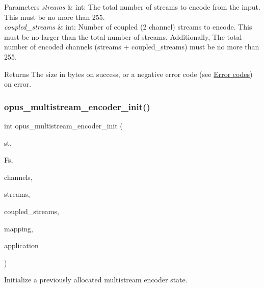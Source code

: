\begin{DoxyParams}{Parameters}
{\em streams} & {\ttfamily int}\+: The total number of streams to encode from the input. This must be no more than 255. \\
\hline
{\em coupled\+\_\+streams} & {\ttfamily int}\+: Number of coupled (2 channel) streams to encode. This must be no larger than the total number of streams. Additionally, The total number of encoded channels ({\ttfamily streams + coupled\+\_\+streams}) must be no more than 255. \\
\hline
\end{DoxyParams}
\begin{DoxyReturn}{Returns}
The size in bytes on success, or a negative error code (see \hyperlink{group__opus__errorcodes}{Error codes}) on error. 
\end{DoxyReturn}
\mbox{\label{group__opus__multistream_gae7586aa54c322fd9599de24b5c8b8c01}} 
\subsubsection{\texorpdfstring{opus\+\_\+multistream\+\_\+encoder\+\_\+init()}{opus\_multistream\_encoder\_init()}}
{\footnotesize\ttfamily int opus\+\_\+multistream\+\_\+encoder\+\_\+init (\begin{DoxyParamCaption}\item[{\hyperlink{group__opus__multistream_gae5826674d142fc873ebc1d781c507dd7}{Opus\+M\+S\+Encoder} $\ast$}]{st,  }\item[{\hyperlink{opus__types_8h_aa4d309d6f80b99dbabebc8f98879ab9a}{opus\+\_\+int32}}]{Fs,  }\item[{int}]{channels,  }\item[{int}]{streams,  }\item[{int}]{coupled\+\_\+streams,  }\item[{const unsigned char $\ast$}]{mapping,  }\item[{int}]{application }\end{DoxyParamCaption})}



Initialize a previously allocated multistream encoder state. 

